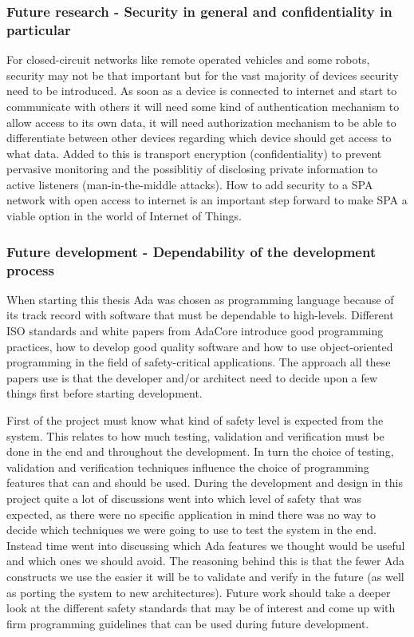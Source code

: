 \subsubsection{Future research - Security in general and confidentiality in
particular}
For closed-circuit networks like remote operated vehicles and some robots,
security may not be that important but for the vast majority of devices
security need to be introduced. As soon as a device is connected to internet
and start to communicate with others it will need some kind of authentication
mechanism to allow access to its own data, it will need authorization mechanism
to be able to differentiate between other devices regarding which
device should get access to what data. Added to this is transport encryption
(confidentiality) to prevent pervasive monitoring and the possiblitiy of
disclosing private information to active listeners (man-in-the-middle attacks).
How to add security to a SPA network with open access to internet is an
important step forward to make SPA a viable option in the world of Internet of
Things.

\subsubsection{Future development - Dependability of the development process}
When starting this thesis Ada was chosen as programming language because of its
track record with software that must be dependable to high-levels. Different
ISO standards and white papers from AdaCore introduce good programming
practices, how to develop good quality software and how to use object-oriented
programming in the field of safety-critical applications. The approach all
these papers use is that the developer and/or architect need to decide upon a
few things first before starting development.

First of the project must know what kind of safety level is expected from the
system. This relates to how much testing, validation and verification must
be done in the end and throughout the development. In turn the choice of
testing, validation and verification techniques influence the choice of
programming features that can and should be used. During the development and
design in this project quite a lot of discussions went into which level of
safety that was expected, as there were no specific application in mind
there was no way to decide which techniques we were going to use to test the
system in the end. Instead time went into discussing which Ada features we
thought would be useful and which ones we should avoid. The reasoning
behind this is that the fewer Ada constructs we use the easier it will be to
validate and verify in the future (as well as porting the system to new
architectures). Future work should take a deeper look at the different safety
standards that may be of interest and come up with firm programming guidelines
that can be used during future development.

